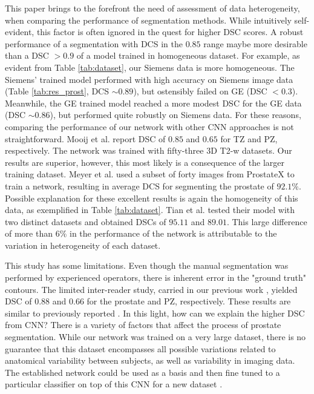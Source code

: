 This paper brings to the forefront the need of assessment of data heterogeneity, when comparing the performance of segmentation methods. While intuitively self-evident, this factor is often ignored in the quest for higher DSC scores. A robust performance of a segmentation with DCS in the $0.85$ range maybe more desirable than a DSC $> 0.9$ of a model trained in homogeneous dataset. For example, as evident from Table \ref{tab:dataset}, our Siemens data is more homogeneous. The Siemens' trained model performed with high accuracy on Siemens image data (Table \ref{tab:res_prost}, DCS $\sim0.89$), but ostensibly failed on GE (DSC $< 0.3$). Meanwhile, the GE trained model reached a more modest DSC for the GE data (DSC $\sim0.86$), but performed quite robustly on Siemens data. 
For these reasons, comparing the performance of our network with other CNN approaches is not straightforward. Mooij et al. \cite{mooij_automatic_2018} report DSC of $0.85$ and $0.65$ for TZ and PZ, respectively. The network was trained with fifty-three 3D T2-w datasets. Our results are superior, however, this most likely is a consequence of the larger training dataset. Meyer et al. \cite{anneke} used a subset of forty images from ProstateX to train a network, resulting in average DCS for segmenting the prostate of $92.1\%$. Possible explanation for these excellent results is again the homogeneity of this data, as exemplified in Table \ref{tab:dataset}. Tian et al. \cite{to2018deep} tested their model with two distinct datasets and obtained DSCs of $95.11$ and $89.01$. This large difference of more than $6\%$ in the performance of the network is attributable to the variation in heterogeneity of each dataset. 

This study has some limitations. Even though the manual segmentation was performed by experienced operators, there is inherent error in the "ground truth" contours. The limited inter-reader study, carried in our previous work \cite{deukwoo_classification_2018}, yielded DSC of $0.88$ and $0.66$ for the prostate and PZ, respectively. These results are similar to previously reported \cite{4_klein2008automatic}. In this light, how can we explain the higher DSC from CNN? There is a variety of factors that affect the process of prostate segmentation. While our network was trained on a very large dataset, there is no guarantee that this dataset encompasses all possible variations related to anatomical variability between subjects, as well as variability in imaging data. The established network could be used as a basis and then fine tuned to a particular classifier on top of this CNN for a new dataset \cite{tajbakhsh2016convolutional}.
